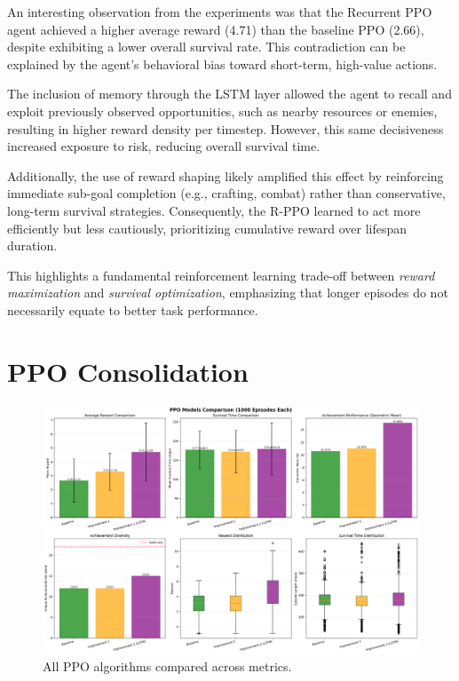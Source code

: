 \documentclass[twocolumn]{article}
\begin{document}
An interesting observation from the experiments was that the Recurrent PPO  agent achieved a higher average reward (4.71) than the baseline PPO (2.66), despite exhibiting a lower overall survival rate. This contradiction can be explained by the agent's behavioral bias toward short-term, high-value actions.

The inclusion of memory through the LSTM layer allowed the agent to recall and exploit previously observed opportunities, such as nearby resources or enemies, resulting in higher reward density per timestep. However, this same decisiveness increased exposure to risk, reducing overall survival time.

Additionally, the use of reward shaping likely amplified this effect by reinforcing immediate sub-goal completion (e.g., crafting, combat) rather than conservative, long-term survival strategies. Consequently, the R-PPO learned to act more efficiently but less cautiously, prioritizing cumulative reward over lifespan duration.

This highlights a fundamental reinforcement learning trade-off between \textit{reward maximization} and \textit{survival optimization}, emphasizing that longer episodes do not necessarily equate to better task performance.

\section*{PPO Consolidation}
\begin{figure}[H]
    \centering
    \includegraphics[width=0.75\linewidth]{images/final_comparison_1000_episodes.png}
    \caption{All PPO algorithms compared across metrics.}
    \label{fig:placeholder}
\end{figure}

\printbibliography
\end{document}
